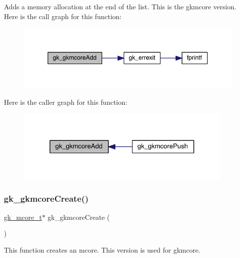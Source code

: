 Adds a memory allocation at the end of the list. This is the gkmcore version. Here is the call graph for this function\+:\nopagebreak
\begin{figure}[H]
\begin{center}
\leavevmode
\includegraphics[width=344pt]{a00107_a3777d3929aad6ae5e17b76656cd6797b_cgraph}
\end{center}
\end{figure}
Here is the caller graph for this function\+:\nopagebreak
\begin{figure}[H]
\begin{center}
\leavevmode
\includegraphics[width=300pt]{a00107_a3777d3929aad6ae5e17b76656cd6797b_icgraph}
\end{center}
\end{figure}
\mbox{\label{a00107_afe0ba6f8d611bfebcbe80468c86af884}} 
\subsubsection{\texorpdfstring{gk\+\_\+gkmcore\+Create()}{gk\_gkmcoreCreate()}}
{\footnotesize\ttfamily \hyperlink{a00682}{gk\+\_\+mcore\+\_\+t}$\ast$ gk\+\_\+gkmcore\+Create (\begin{DoxyParamCaption}{ }\end{DoxyParamCaption})}

This function creates an mcore. This version is used for gkmcore. \mbox{\label{a00107_a6b0166aa10e35fb252f8561cac8f3bbb}} 
